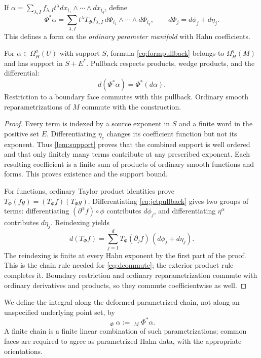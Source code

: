 \documentclass[11pt,letterpaper]{article}
\theoremstyle{definition}
\theoremstyle{remark}
\newcommand{\HInt}{\mathop{\int^{\!H}}\nolimits}\newcommand{\HCoint}{\mathop{\oint^{\!H}}\nolimits}
\numberwithin{equation}{section}
\begin{document}
If $\alpha=\sum_{\lambda,I}f_{\lambda,I}t^\lambda dx_{i_1}\wedge\cdots\wedge dx_{i_q}$, define
\begin{equation}\label{eq:formpullback}
 \Phi^*\alpha=
 \sum_{\lambda,I}t^\lambda T_\Phi f_{\lambda,I}
       \,d\Phi_{i_1}\wedge\cdots\wedge d\Phi_{i_q},
 \qquad d\Phi_j=d\phi_j+d\eta_j.
\end{equation}
This defines a form on the \emph{ordinary parameter manifold} with Hahn coefficients.

\begin{lemma}\label{lem:pullback}
For $\alpha\in\Omega_H^q(U)$ with support $S$, formula \eqref{eq:formpullback} belongs to $\Omega_H^q(M)$ and has support in $S+E^*$. Pullback respects products, wedge products, and the differential:
\begin{equation}\label{eq:dcommute}
 d(\Phi^*\alpha)=\Phi^*(d\alpha).
\end{equation}
Restriction to a boundary face commutes with this pullback. Ordinary smooth reparametrizations of $M$ commute with the construction.
\end{lemma}
\begin{proof}
Every term is indexed by a source exponent in $S$ and a finite word in the positive set $E$. Differentiating $\eta_e$ changes its coefficient function but not its exponent. Thus \cref{lem:support} proves that the combined support is well ordered and that only finitely many terms contribute at any prescribed exponent. Each resulting coefficient is a finite sum of products of ordinary smooth functions and forms. This proves existence and the support bound.

For functions, ordinary Taylor product identities prove $T_\Phi(fg)=(T_\Phi f)(T_\Phi g)$. Differentiating \eqref{eq:jetpullback} gives two groups of terms: differentiating $(\partial^\alpha f)\circ\phi$ contributes $d\phi_j$, and differentiating $\eta^\alpha$ contributes $d\eta_j$. Reindexing yields
\[
 d(T_\Phi f)=\sum_{j=1}^d T_\Phi(\partial_jf)\,(d\phi_j+d\eta_j).
\]
The reindexing is finite at every Hahn exponent by the first part of the proof. This is the chain rule needed for \eqref{eq:dcommute}; the exterior product rule completes it. Boundary restriction and ordinary reparametrization commute with ordinary derivatives and products, so they commute coefficientwise as well.
\end{proof}

We define the integral along the deformed parametrized chain, not along an unspecified underlying point set, by
\begin{equation}\label{eq:deformedint}
 \HInt_\Phi\alpha:=\HInt_M\Phi^*\alpha.
\end{equation}
A finite chain is a finite linear combination of such parametrizations; common faces are required to agree as parametrized Hahn data, with the appropriate orientations.
\end{document}
